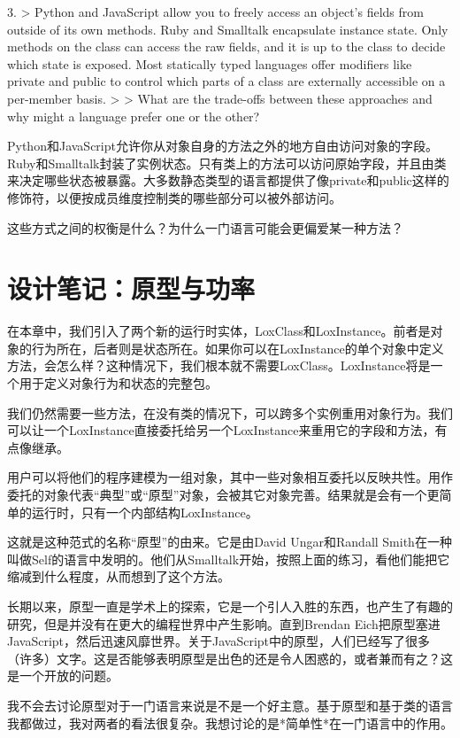 \documentclass[cn,11pt,chinese]{elegantbook}
\begin{document}
3. > Python and JavaScript allow you to freely access an object’s fields from outside of its own methods. Ruby and Smalltalk encapsulate instance state. Only methods on the class can access the raw fields, and it is up to the class to decide which state is exposed. Most statically typed languages offer modifiers like private and public to control which parts of a class are externally accessible on a per-member basis.
   >
   > What are the trade-offs between these approaches and why might a language prefer one or the other?

   Python和JavaScript允许你从对象自身的方法之外的地方自由访问对象的字段。Ruby和Smalltalk封装了实例状态。只有类上的方法可以访问原始字段，并且由类来决定哪些状态被暴露。大多数静态类型的语言都提供了像private和public这样的修饰符，以便按成员维度控制类的哪些部分可以被外部访问。

   这些方式之间的权衡是什么？为什么一门语言可能会更偏爱某一种方法？

\section{设计笔记：原型与功率}

在本章中，我们引入了两个新的运行时实体，LoxClass和LoxInstance。前者是对象的行为所在，后者则是状态所在。如果你可以在LoxInstance的单个对象中定义方法，会怎么样？这种情况下，我们根本就不需要LoxClass。LoxInstance将是一个用于定义对象行为和状态的完整包。

我们仍然需要一些方法，在没有类的情况下，可以跨多个实例重用对象行为。我们可以让一个LoxInstance直接委托给另一个LoxInstance来重用它的字段和方法，有点像继承。

用户可以将他们的程序建模为一组对象，其中一些对象相互委托以反映共性。用作委托的对象代表“典型”或“原型”对象，会被其它对象完善。结果就是会有一个更简单的运行时，只有一个内部结构LoxInstance。

这就是这种范式的名称“原型”的由来。它是由David Ungar和Randall Smith在一种叫做Self的语言中发明的。他们从Smalltalk开始，按照上面的练习，看他们能把它缩减到什么程度，从而想到了这个方法。

长期以来，原型一直是学术上的探索，它是一个引人入胜的东西，也产生了有趣的研究，但是并没有在更大的编程世界中产生影响。直到Brendan Eich把原型塞进JavaScript，然后迅速风靡世界。关于JavaScript中的原型，人们已经写了很多（许多）文字。这是否能够表明原型是出色的还是令人困惑的，或者兼而有之？这是一个开放的问题。

我不会去讨论原型对于一门语言来说是不是一个好主意。基于原型和基于类的语言我都做过，我对两者的看法很复杂。我想讨论的是*简单性*在一门语言中的作用。
\end{document}
